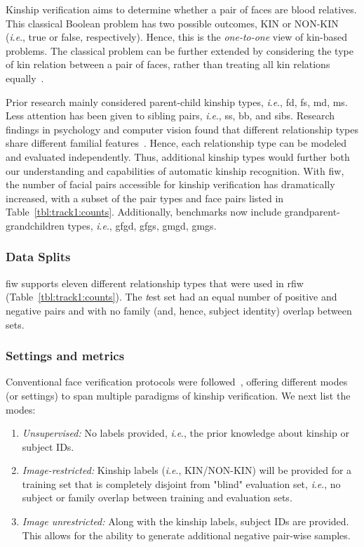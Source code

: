 \documentclass[letterpaper, 10 pt, conference]{ieeeconf}
\newcommand{\ie}{\textit{i}.\textit{e}., }
\begin{document}
Kinship verification aims to determine whether a pair of faces are blood relatives. This classical Boolean problem has two possible outcomes, KIN or NON-KIN (\ie true or false, respectively). Hence, this is the \textit{one-to-one} view of kin-based problems. The classical problem can be further extended by considering the type of kin relation between a pair of faces, rather than treating all kin relations equally~\cite{robinson2018recognize}.


 
Prior research mainly considered parent-child kinship types, \ie \ac{fd}, \ac{fs}, \ac{md}, \ac{ms}. Less attention has been given to sibling pairs, \ie \ac{ss}, \ac{bb}, and \ac{sibs}. Research findings in psychology and computer vision found that different relationship types share different familial features~\cite{Ming_CVPR11_Genealogical}. Hence, each relationship type can be modeled and evaluated independently. Thus, additional kinship types would further both our understanding and capabilities of automatic kinship recognition. With \ac{fiw}, the number of facial pairs accessible for kinship verification has dramatically increased, with a subset of the pair types and face pairs listed in Table~\ref{tbl:track1:counts}. Additionally, benchmarks now include grandparent-grandchildren types, \ie \ac{gfgd}, \ac{gfgs}, \ac{gmgd}, \ac{gmgs}.


\subsubsection{Data Splits}
 \ac{fiw} supports eleven different relationship types that were used in \ac{rfiw} (Table~\ref{tbl:track1:counts}). The {\emph test} set had an equal number of positive and negative pairs and with no family (and, hence, subject identity) overlap between sets. 


\subsubsection{Settings and metrics}\label{subsec:track1:settings}
Conventional face verification protocols were followed~\cite{LFWTech}, offering different modes (or settings) to span multiple paradigms of kinship verification. We next list the modes:
\begin{enumerate}
    \item \textit{Unsupervised:} No labels provided, \ie the prior knowledge about kinship or subject IDs.
    \item \textit{Image-restricted:} Kinship labels (\ie KIN/NON-KIN) will be provided for a training set that is completely disjoint from "blind" evaluation set, \ie no subject or family overlap between training and evaluation sets.
    \item \textit{Image unrestricted:} Along with the kinship labels, subject IDs are provided. This allows for the ability to generate additional negative pair-wise samples.
\end{enumerate}
\end{document}
